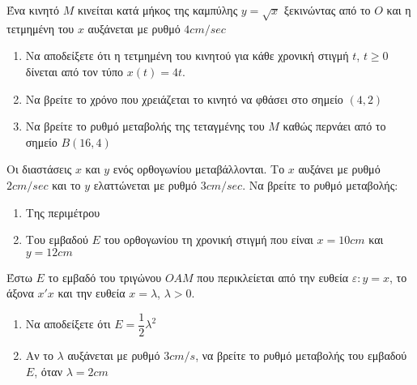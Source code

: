 \documentclass{presentation}
\begin{document}
\begin{askisi}
    Ένα κινητό $Μ$ κινείται κατά μήκος της καμπύλης $y=\sqrt{x}$ ξεκινώντας από το $Ο$ και η τετμημένη του $x$ αυξάνεται με ρυθμό $4cm/sec$
    \begin{enumerate}
        \item<1-> Να αποδείξετε ότι η τετμημένη του κινητού για κάθε χρονική στιγμή $t$, $t\ge 0$ δίνεται από τον τύπο $x(t)=4t$.
        \item<2-> Να βρείτε το χρόνο που χρειάζεται το κινητό να φθάσει στο σημείο $(4,2)$
        \item<3-> Να βρείτε το ρυθμό μεταβολής της τεταγμένης του $Μ$ καθώς περνάει από το σημείο $Β(16,4)$
    \end{enumerate}

\end{askisi}

\begin{askisi}
    Οι διαστάσεις $x$ και $y$ ενός ορθογωνίου μεταβάλλονται. Το $x$ αυξάνει με ρυθμό $2cm/sec$ και το $y$ ελαττώνεται με ρυθμό $3cm/sec$. Να βρείτε το ρυθμό μεταβολής:
    \begin{enumerate}
        \item<1-> Της περιμέτρου
        \item<2-> Του εμβαδού $Ε$ του ορθογωνίου τη χρονική στιγμή που είναι $x=10cm$ και $y=12cm$
    \end{enumerate}

\end{askisi}

\begin{askisi}
    Έστω $Ε$ το εμβαδό του τριγώνου $ΟΑΜ$ που περικλείεται από την ευθεία $ε:y=x$, το άξονα $x'x$ και την ευθεία $x=λ$, $λ>0$.
    \begin{enumerate}
        \item<1-> Να αποδείξετε ότι $Ε=\dfrac{1}{2}λ^2$
        \item<2-> Αν το $λ$ αυξάνεται με ρυθμό $3cm/s$, να βρείτε το ρυθμό μεταβολής του εμβαδού $Ε$, όταν $λ=2cm$
    \end{enumerate}

\end{askisi}
\end{document}
